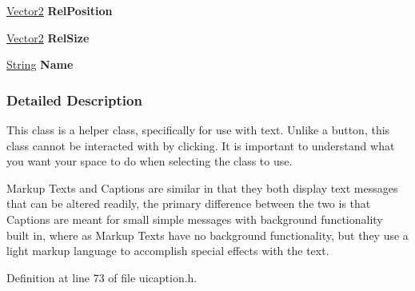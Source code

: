 \begin{DoxyCompactItemize}
\item 
\hypertarget{classphys_1_1UI_1_1Caption_a63061f6c9799bea406eba1060ec9daa4}{
\hyperlink{classphys_1_1Vector2}{Vector2} {\bfseries RelPosition}}
\label{classphys_1_1UI_1_1Caption_a63061f6c9799bea406eba1060ec9daa4}

\item 
\hypertarget{classphys_1_1UI_1_1Caption_acd511c5bc0d19986a1869d5d5e4f9094}{
\hyperlink{classphys_1_1Vector2}{Vector2} {\bfseries RelSize}}
\label{classphys_1_1UI_1_1Caption_acd511c5bc0d19986a1869d5d5e4f9094}

\item 
\hypertarget{classphys_1_1UI_1_1Caption_a6d5f0c79c720695e3f4e009e590a8827}{
\hyperlink{namespacephys_aa03900411993de7fbfec4789bc1d392e}{String} {\bfseries Name}}
\label{classphys_1_1UI_1_1Caption_a6d5f0c79c720695e3f4e009e590a8827}

\end{DoxyCompactItemize}


\subsubsection{Detailed Description}
This class is a helper class, specifically for use with text. Unlike a button, this class cannot be interacted with by clicking. It is important to understand what you want your space to do when selecting the class to use. \par
 \par
 Markup Texts and Captions are similar in that they both display text messages that can be altered readily, the primary difference between the two is that Captions are meant for small simple messages with background functionality built in, where as Markup Texts have no background functionality, but they use a light markup language to accomplish special effects with the text. 

Definition at line 73 of file uicaption.h.



